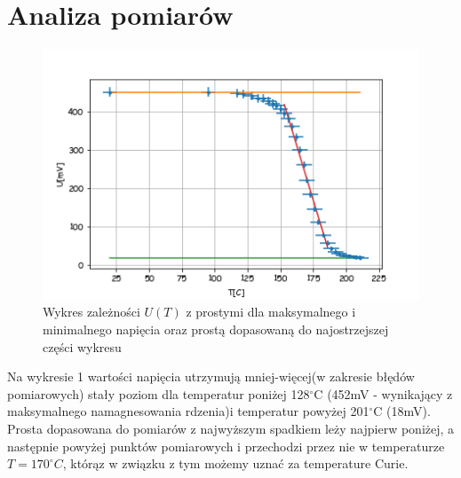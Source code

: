 \documentclass[a4paper,10pt]{article}
\begin{document}
\section{Analiza pomiarów}

\begin{figure}[H]
  \includegraphics{./Curie_proste.png}
  \caption{Wykres zależności $U(T)$ z prostymi dla maksymalnego i minimalnego napięcia oraz prostą dopasowaną do najostrzejszej części wykresu}
\end{figure}

Na wykresie 1 wartości napięcia utrzymują mniej-więcej(w zakresie błędów pomiarowych) stały poziom dla temperatur poniżej 128$^\circ$C (452mV
- wynikający z maksymalnego namagnesowania rdzenia)i temperatur powyżej 201$^\circ$C (18mV). 
Prosta dopasowana do pomiarów z najwyższym spadkiem leży najpierw
poniżej, a następnie powyżej punktów pomiarowych i przechodzi przez nie w temperaturze $T = 170^\circ C$, którąz w związku z tym możemy uznać za temperature Curie.
\end{document}
